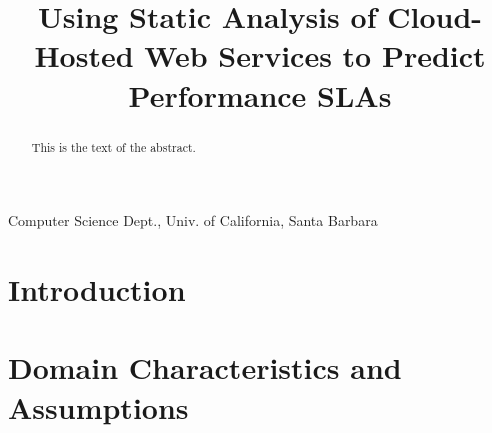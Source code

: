 \documentclass[preprint,10pt]{sigplanconf}
\begin{document}
\setlength{\pdfpageheight}{\paperheight}
\setlength{\pdfpagewidth}{\paperwidth}






\title{Using Static Analysis of Cloud-Hosted Web Services to Predict Performance SLAs}

           {Computer Science Dept., Univ. of California, Santa Barbara}

\maketitle
\date{}

\begin{abstract}
This is the text of the abstract.
\end{abstract}




\section{Introduction}
\label{sec:intro}


\section{Domain Characteristics and Assumptions}
\label{sec:approach}


\end{document}
